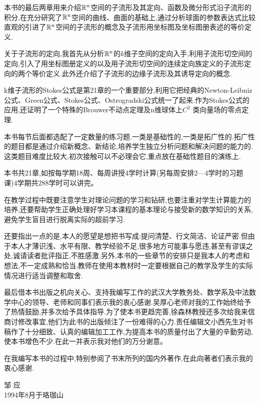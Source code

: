 本书的最后两章用来介绍$\mathbb{R}^n$空间的子流形及其定向、函数及微分形式沿子流形的积分,在充分研究了$\mathbb{R}^n$空间的曲线、曲面的基础上,通过分析球面的参数表达式比较直观的引进了$\mathbb{R}^n$空间的子流形的概念及子流形用坐标图及坐标图册表述的等价定义.

关于子流形的定向,我首先从分析$\mathbb{R}^n$的$k$维子空间的定向入手,利用子流形切空间的定向,引入了用坐标图册定义的以及用子流形切空间的连续定向族定义的子流形定向的两个等价定义.此外还介绍了子流形的边缘子流形及其诱导定向的概念.

k维子流形的Stokes公式是第21章的一个重要部分,利用它把经典的Newton-Leibniz公式、Green公式、Stokes公式、Ostrogradski公式统一了起来.作为Stokes公式的应用,还证明了一个特殊的Brouwer不动点定理及n维球体上\(C^2\) 类向量场的零点定理.

本书每节后面都选配了一定数量的练习题.一类是基础性的,一类是拓广性的.拓广性的题目都是通过介绍新概念、新结论,培养学生独立分析问题和解决问题的能力的.这类题目难度比较大,初次接触可以不必理会它,重点放在基础性题目的演练上.

本书共21章,如按每学期18周、每周讲授4学时计算(另每周安排2---4学时的习题课)4学期共288学时可以讲完。

在教学过程中既要注意学生对理论问题的学习和钻研,也要注重对学生计算能力的培养,还要帮助学生正确处理好学习本课程的基本理论与接受新的数学知识的关系,避免学生盲目进行脱离实际的超前学习.

还要指出一点的是,本人的愿望是想把书写成:提问清楚、行文简洁、论证严密.但由于本人才薄识浅、水平有限、教学经验不足,很多地方可能事与愿违,甚至有谬误之处,诚请读者批评指正,不胜感激.另外,本书的一些章节的安排只是我本人的考虑和想法,不一定成熟和恰当,教师在使用本教材时一定要根据自己的教学及学生的实际情况进行适当调整和取舍.

最后借本书出版之机向关心、支持我编写工作的武汉大学教务处、数学系及中法数学中心的领导、老师和同事们表示我的衷心感谢.吴厚心老师对我的工作始终给予了热情鼓励,并多次给予具体指导.为了使本书更趋完善,徐森林教授还多次给我来信商讨修改事宜,他们为此书的出版倾注了一份难得的心力.责任编辑文小西先生对书稿作了十分细致、认真的编辑加工工作,为提高本书的质量付出了大量的辛勤劳动,使本书增色不少.在此一并表示我对他们的万分谢意。


在我编写本书的过程中,特别参阅了书末所列的国内外著作,在此向著者们表示我的衷心感谢.


\begin{flushright}
邹 应
\\1994年8月于珞珈山
\end{flushright}

\endgroup

